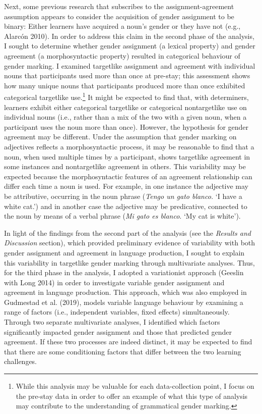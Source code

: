 \documentclass[12pt]{article}
\newenvironment{styleNoSpacing}{\setlength\leftskip{0cm}\setlength\rightskip{0cm plus 1fil}\setlength\parindent{0cm}\setlength\parfillskip{0pt plus 1fil}\setlength\parskip{0cm plus 1pt}\writerlistparindent\writerlistleftskip\leavevmode\normalfont\normalsize\fontsize{11pt}{13.2pt}\selectfont\writerlistlabel\ignorespaces}{\unskip\vspace{0cm plus 1pt}\par}
\newcommand\writerlistleftskip{}
\newcommand\writerlistparindent{}
\newcommand\writerlistlabel{}
\begin{document}
\begin{styleNoSpacing}
Next, some previous research that subscribes to the assignment-agreement assumption appears to consider the acquisition of gender assignment to be binary: Either learners have acquired a noun’s gender or they have not (e.g., Alarcón 2010). In order to address this claim in the second phase of the analysis, I sought to determine whether gender assignment (a lexical property) and gender agreement (a morphosyntactic property) resulted in categorical behaviour of gender marking. I examined targetlike assignment and agreement with individual nouns that participants used more than once at pre-stay; this assessment shows how many unique nouns that participants produced more than once exhibited categorical targetlike use.\footnote{\textrm{ While this analysis may be valuable for each data-collection point, I focus on the pre-stay data in order to offer an example of what this type of analysis may contribute to the understanding of grammatical gender marking.}} It might be expected to find that, with determiners, learners exhibit either categorical targetlike or categorical nontargetlike use on individual nouns (i.e., rather than a mix of the two with a given noun, when a participant uses the noun more than once). However, the hypothesis for gender agreement may be different. Under the assumption that gender marking on adjectives reflects a morphosyntactic process, it may be reasonable to find that a noun, when used multiple times by a participant, shows targetlike agreement in some instances and nontargetlike agreement in others. This variability may be expected because the morphosyntactic features of an agreement relationship can differ each time a noun is used. For example, in one instance the adjective may be attributive, occurring in the noun phrase (\textit{Tengo un gato blanco. }‘I have a white cat.’) and in another case the adjective may be predicative, connected to the noun by means of a verbal phrase (\textit{Mi gato es blanco}. ‘My cat is white’).
\end{styleNoSpacing}

\begin{styleNoSpacing}
In light of the findings from the second part of the analysis (see the \textit{Results and Discussion} section), which provided preliminary evidence of variability with both gender assignment and agreement in language production, I sought to explain this variability in targetlike gender marking through multivariate analyses. Thus, for the third phase in the analysis, I adopted a variationist approach (Geeslin with Long 2014) in order to investigate variable gender assignment and agreement in language production. This approach, which was also employed in Gudmestad et al. (2019), models variable language behaviour by examining a range of factors (i.e., independent variables, fixed effects) simultaneously. Through two separate multivariate analyses, I identified which factors significantly impacted gender assignment and those that predicted gender agreement. If these two processes are indeed distinct, it may be expected to find that there are some conditioning factors that differ between the two learning challenges. 
\end{styleNoSpacing}
\end{document}
